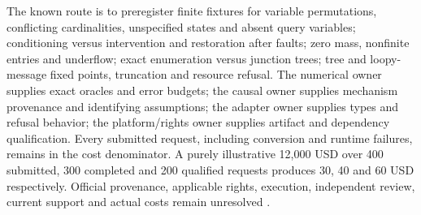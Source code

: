 The known route is to preregister finite fixtures for variable permutations,
conflicting cardinalities, unspecified states and absent query variables;
conditioning versus intervention and restoration after faults; zero mass,
nonfinite entries and underflow; exact enumeration versus junction trees;
tree and loopy-message fixed points, truncation and resource refusal.
The numerical owner supplies exact oracles and error budgets; the causal
owner supplies mechanism provenance and identifying assumptions; the
adapter owner supplies types and refusal behavior; the platform/rights owner
supplies artifact and dependency qualification. Every submitted request,
including conversion and runtime failures, remains in the cost denominator.
A purely illustrative 12,000 USD over 400 submitted, 300 completed and
200 qualified requests produces 30, 40 and 60 USD respectively.
Official provenance, applicable rights, execution, independent review, current support and actual costs remain unresolved \citep{exec24_libdai_choice}.
